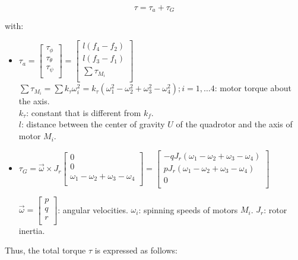 \documentclass{thesisreport}
\begin{document}
\begin{equation}
	\tau = \tau_a + \tau_G
\end{equation}

with:

\begin{itemize}
	\item $\tau_a = \begin{bmatrix}
\tau_{\phi}\\
\tau_{\theta}\\
\tau_{\psi}\\
\end{bmatrix}= \begin{bmatrix}
l(f_4 - f_2)\\
l(f_3 - f_1)\\
\sum \tau_{M_i}\\
\end{bmatrix}$\\
$\sum \tau_{M_i} = \sum k_{\tau} \omega_i^2=k_{\tau}(\omega_1^2-\omega_2^2+\omega_3^2-\omega_4^2); i=1,\ldots 4$: motor torque about the axis.\\
$k_{\tau}$: constant that is different from $k_f$.\\
$l$: distance between the center of gravity $U$ of the quadrotor and the axis of motor $M_i$.

	\item $\tau_G=\overrightarrow{\omega}\times J_r \begin{bmatrix}
0 \\
0 \\
\omega_1 - \omega_2 + \omega_3 - \omega_4 \\
\end{bmatrix} = \begin{bmatrix}
-q J_r (\omega_1 - \omega_2 + \omega_3 - \omega_4)\\
p J_r (\omega_1 - \omega_2 + \omega_3 - \omega_4)\\
0 \\
\end{bmatrix}$

$\overrightarrow{\omega} = \begin{bmatrix}
p \\
q \\
r \\
\end{bmatrix}$: angular velocities.
$\omega_i$: spinning speeds of motors $M_i$.
$J_r$: rotor inertia.
\end{itemize}

Thus, the total torque $\tau$ is expressed as follows:
\end{document}
